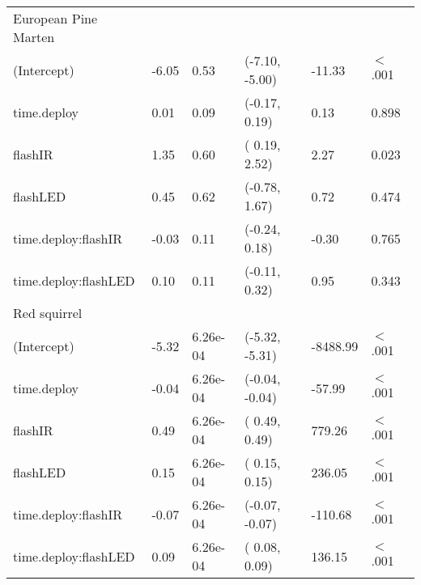 \begin{table}[ht]
\begin{tabular}{llllll}
  European Pine Marten &  &  &  &  &        \\ 
  (Intercept) & -6.05 & 0.53 & (-7.10, -5.00) & -11.33 & $<$ .001 \\ 
  time.deploy & 0.01 & 0.09 & (-0.17,  0.19) & 0.13 & 0.898  \\ 
  flashIR & 1.35 & 0.60 & ( 0.19,  2.52) & 2.27 & 0.023  \\ 
  flashLED & 0.45 & 0.62 & (-0.78,  1.67) & 0.72 & 0.474  \\ 
  time.deploy:flashIR & -0.03 & 0.11 & (-0.24,  0.18) & -0.30 & 0.765  \\ 
  time.deploy:flashLED & 0.10 & 0.11 & (-0.11,  0.32) & 0.95 & 0.343  \\ 
  Red squirrel &  &  &  &  &        \\ 
  (Intercept) & -5.32 & 6.26e-04 & (-5.32, -5.31) & -8488.99 & $<$ .001 \\ 
  time.deploy & -0.04 & 6.26e-04 & (-0.04, -0.04) & -57.99 & $<$ .001 \\ 
  flashIR & 0.49 & 6.26e-04 & ( 0.49,  0.49) & 779.26 & $<$ .001 \\ 
  flashLED & 0.15 & 6.26e-04 & ( 0.15,  0.15) & 236.05 & $<$ .001 \\ 
  time.deploy:flashIR & -0.07 & 6.26e-04 & (-0.07, -0.07) & -110.68 & $<$ .001 \\ 
  time.deploy:flashLED & 0.09 & 6.26e-04 & ( 0.08,  0.09) & 136.15 & $<$ .001 \\ 
   \hline
\end{tabular}
\end{table}
